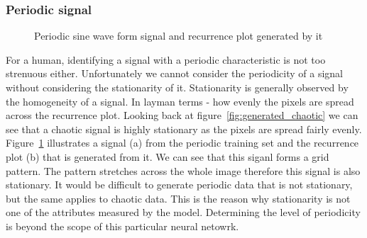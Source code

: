 \documentclass[a4paper,12pt,fleqn]{article}
\begin{document}
\subsubsection{Periodic signal}
\begin{figure}
  \centering
  \qquad
  \caption{Periodic sine wave form signal and recurrence plot generated by it}
  \label{fig:generated_periodic_sin}
\end{figure}
For a human, identifying a signal with a periodic characteristic is not too strenuous either.
Unfortunately we cannot consider the periodicity of a signal without considering the stationarity of it.
Stationarity is generally observed by the homogeneity of a signal.
In layman terms - how evenly the pixels are spread across the recurrence plot.
Looking back at figure~\ref{fig:generated_chaotic} we can see that a chaotic signal is highly stationary as the pixels are spread fairly evenly.
Figure~\ref{fig:generated_periodic_sin} illustrates a signal (a) from the periodic training set and the recurrence plot (b) that is generated from it.
We can see that this siganl forms a grid pattern.
The pattern stretches across the whole image therefore this signal is also stationary.
It would be difficult to generate periodic data that is not stationary, but the same applies to chaotic data.
This is the reason why stationarity is not one of the attributes measured by the model.
Determining the level of periodicity is beyond the scope of this particular neural netowrk.
\end{document}
